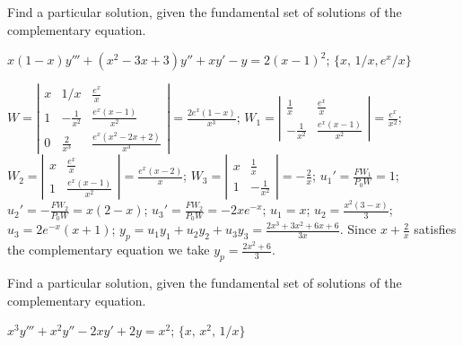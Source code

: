 \documentclass{ximera}
\begin{document}
\begin{problem}\label{exer:9.4.10}
Find a particular
solution, given the fundamental set of solutions of the complementary equation.

$x(1-x)y'''+(x^2-3x+3)y''+xy'-y=2(x-1)^2$; \quad
$\{x,\,1/x,e^x/x\}$

\begin{solution}
$W=\left|\begin{array}{cccc}
x&1/x&\frac{e^x}{x}\\1&-\frac{1}{x^2}&\frac{e^x(x-1)}{x^2}\\
0&\frac{2}{x^3}&\frac{e^x(x^2-2x+2)}{x^3}
\end{array}\right|=\frac{2e^x(1-x)}{x^3}$;
$W_1=\left|\begin{array}{cccc}
\frac{1}{x}&\frac{e^x}{x}\\-\frac{1}{x^2}&\frac{e^x(x-1)}{x^2}
\end{array}\right|=\frac{e^x}{x^2}$;
$W_2=\left|\begin{array}{cccc}
x&\frac{e^x}{x}\\
1&\frac{e^x(x-1)}{x^2}
\end{array}\right|=\frac{e^x(x-2)}{x}$;
$W_3=\left|\begin{array}{cccc}
x&\frac{1}{x}\\
1&-\frac{1}{x^2}
\end{array}\right|=-\frac{2}{x}$;
$u_1'=\frac{FW_1}{P_0W}=1$;
$u_2'=-\frac{FW_2}{P_0W}=x(2-x)$;
$u_3'=\frac{FW_2}{P_0W}=-2xe^{-x}$;
$u_1=x$;
$u_2=\frac{x^2(3-x)}{3}$;
$u_3=2e^{-x}(x+1)$;
$y_p=u_1y_1+u_2y_2+u_3y_3=\frac{2x^3+3x^2+6x+6}{3x}$.
Since $x+\frac{2}{x}$ satisfies the complementary equation
we take $y_p=\frac{2x^2+6}{3}$.
\end{solution}
\end{problem}

\begin{problem}\label{exer:9.4.11}
Find a particular
solution, given the fundamental set of solutions of the complementary equation.

$x^3y'''+x^2y''-2xy'+2y=x^2$;  \quad  $\{x,\,x^2,\,1/x\}$
\end{problem}
\end{document}
